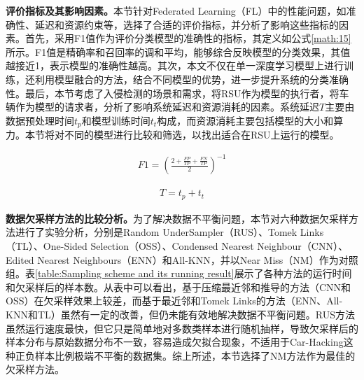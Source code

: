 \textbf{评价指标及其影响因素。}\label{subsection:Evaluation_metrics_and_influencing_factors}本节针对Federated Learning（FL）中的性能问题，如准确性、延迟和资源约束等，选择了合适的评价指标，并分析了影响这些指标的因素。首先，采用F1值作为评价分类模型的准确性的指标，其定义如公式\ref{math:15}所示。F1值是精确率和召回率的调和平均，能够综合反映模型的分类效果，其值越接近1，表示模型的准确性越高。其次，本文不仅在单一深度学习模型上进行训练，还利用模型融合的方法，结合不同模型的优势，进一步提升系统的分类准确性。最后，本节考虑了入侵检测的场景和需求，将RSU作为模型的执行者，将车辆作为模型的请求者，分析了影响系统延迟和资源消耗的因素。系统延迟$T$主要由数据预处理时间$t_p$和模型训练时间$t_t$构成，而资源消耗主要包括模型的大小和算力。本节将对不同的模型进行比较和筛选，以找出适合在RSU上运行的模型。

\begin{equation}
\begin{aligned}
F1=(\frac{2+\frac{FP}{TP}+\frac{FN}{TP}}{2})^{-1}
\label{math:15}
\end{aligned}
\end{equation}

\begin{equation}
\begin{aligned}
T=t_p+t_t
\label{math:16}
\end{aligned}
\end{equation}

\textbf{数据欠采样方法的比较分析。}\label{subsection:Data_undersampling}为了解决数据不平衡问题，本节对六种数据欠采样方法进行了实验分析，分别是Random UnderSampler（RUS）、Tomek Links（TL）、One-Sided Selection（OSS）、Condensed Nearest Neighbour（CNN）、Edited Nearest Neighbours（ENN）和All-KNN，并以Near Miss（NM）作为对照组。表\ref{table:Sampling scheme and its running result}展示了各种方法的运行时间和欠采样后的样本数。从表中可以看出，基于压缩最近邻和推导的方法（CNN和OSS）在欠采样效果上较差，而基于最近邻和Tomek Links的方法（ENN、All-KNN和TL）虽然有一定的改善，但仍未能有效地解决数据不平衡问题。RUS方法虽然运行速度最快，但它只是简单地对多数类样本进行随机抽样，导致欠采样后的样本分布与原始数据分布不一致，容易造成欠拟合现象，不适用于Car-Hacking这种正负样本比例极端不平衡的数据集。综上所述，本节选择了NM方法作为最佳的欠采样方法。

